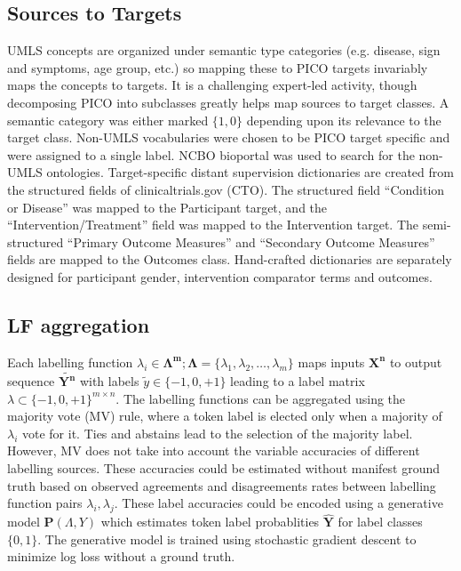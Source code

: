 \documentclass[10.7pt,]{article}
\begin{document}
\subsection{Sources to Targets}\label{lfs}
%
UMLS concepts are organized under semantic type categories (e.g. disease, sign and symptoms, age group, etc.) so mapping these to PICO targets invariably maps the concepts to targets. 
It is a challenging expert-led activity, though decomposing PICO into subclasses greatly helps map sources to target classes.
A semantic category was either marked $\{1, 0\}$ depending upon its relevance to the target class.
Non-UMLS vocabularies were chosen to be PICO target specific and were assigned to a single label.
NCBO bioportal was used to search for the non-UMLS ontologies.
Target-specific distant supervision dictionaries are created from the structured fields of clinicaltrials.gov (CTO). 
The structured field ``Condition or Disease'' was mapped to the Participant target, and the ``Intervention/Treatment'' field was mapped to the Intervention target.
The semi-structured ``Primary Outcome Measures'' and ``Secondary Outcome Measures'' fields are mapped to the Outcomes class.
Hand-crafted dictionaries are separately designed for participant gender, intervention comparator terms and outcomes.

%
%
%
\subsection{LF aggregation}\label{lms}
%
Each labelling function $ \lambda_{i} \in \bm{\Lambda^{m}}; \bm{\Lambda} = \{\lambda_{1}, \lambda_{2}, \dotso, \lambda_{m} \} $ maps inputs $\bm{X^{n}}$ to output sequence $ \widetilde{\bm{Y^{n}}}$ with labels $\widetilde{y} \in \{-1, 0, +1\}$ leading to a label matrix $ \lambda \subset \{-1, 0, +1\}^{m \times n}$.
The labelling functions can be aggregated using the majority vote (MV) rule, where a token label is elected only when a majority of $\lambda_{i}$ vote for it. 
Ties and abstains lead to the selection of the majority label.
However, MV does not take into account the variable accuracies of different labelling sources.
These accuracies could be estimated without manifest ground truth based on observed agreements and disagreements rates between labelling function pairs $ \lambda_{i}, \lambda_{j}$.
These label accuracies could be encoded using a generative model $ \bm{P} ( \Lambda , Y )$ which estimates token label probablities $\bm{\hat{Y}}$ for label classes $ \{ 0, 1\} $.
The generative model is trained using stochastic gradient descent to minimize log loss without a ground truth.
%
%
%
\end{document}
